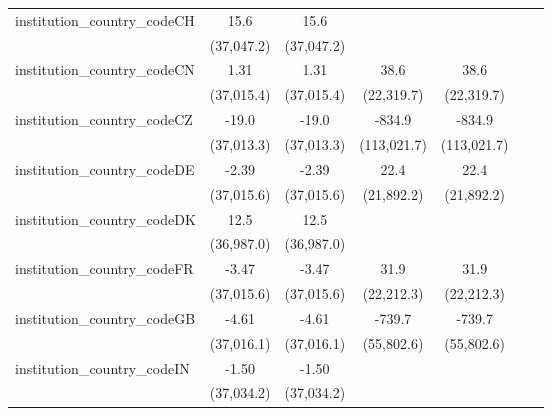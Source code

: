 \begin{tabular}{lcccccc}
   institution\_country\_codeCH          & 15.6         & 15.6         &              &              &            &   \\   
                                         & (37,047.2)   & (37,047.2)   &              &              &            &   \\   
   institution\_country\_codeCN          & 1.31         & 1.31         & 38.6         & 38.6         &            &   \\   
                                         & (37,015.4)   & (37,015.4)   & (22,319.7)   & (22,319.7)   &            &   \\   
   institution\_country\_codeCZ          & -19.0        & -19.0        & -834.9       & -834.9       &            &   \\   
                                         & (37,013.3)   & (37,013.3)   & (113,021.7)  & (113,021.7)  &            &   \\   
   institution\_country\_codeDE          & -2.39        & -2.39        & 22.4         & 22.4         &            &   \\   
                                         & (37,015.6)   & (37,015.6)   & (21,892.2)   & (21,892.2)   &            &   \\   
   institution\_country\_codeDK          & 12.5         & 12.5         &              &              &            &   \\   
                                         & (36,987.0)   & (36,987.0)   &              &              &            &   \\   
   institution\_country\_codeFR          & -3.47        & -3.47        & 31.9         & 31.9         &            &   \\   
                                         & (37,015.6)   & (37,015.6)   & (22,212.3)   & (22,212.3)   &            &   \\   
   institution\_country\_codeGB          & -4.61        & -4.61        & -739.7       & -739.7       &            &   \\   
                                         & (37,016.1)   & (37,016.1)   & (55,802.6)   & (55,802.6)   &            &   \\   
   institution\_country\_codeIN          & -1.50        & -1.50        &              &              &            &   \\   
                                         & (37,034.2)   & (37,034.2)   &              &              &            &   \\   

\end{tabular}
